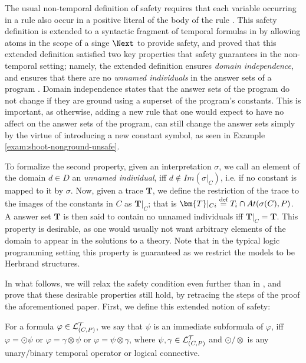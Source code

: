 The usual non-temporal definition of safety requires that each
variable occurring in a rule also occur in a positive literal of the
body of the rule \cite{gekakasc12a}. This safety definition is
extended to a syntactic fragment of temporal formulas in
\cite{agcapevidi17a} by allowing atoms in the scope of a singe $\Next$
to provide safety, and proved that this extended definition satisfied
two key properties that safety guarantees in the non-temporal setting;
namely, the extended definition ensures \emph{domain independence},
and ensures that there are no \emph{unnamed individuals} in the answer
sets of a program \cite{capeva09a}\cite{capeva09b}. Domain
independence states that the answer sets of the program do not change
if they are ground using a superset of the program's constants. This
is important, as otherwise, adding a new rule that one would expect to
have no affect on the answer sets of the program, can still change the
answer sets simply by the virtue of introducing a new constant symbol,
as seen in Example \ref{exam:shoot-nonground-unsafe}.

To formalize the second property, given an interpretation $\sigma$, we
call an element of the domain $d \in D$ an \emph{unnamed individual},
iff $d \not\in Im(\sigma\vert_{C})$, i.e. if no constant is mapped to
it by $\sigma$. Now, given a trace $\bm{T}$, we define the restriction
of the trace to the images of the constants in $C$ as
$\bm{T}\vert _C$; that is
$\bm{T}\vert_{Ci} \defeq T_i \cap At(\sigma(C),P)$. A answer set
$\bm{T}$ is then said to contain no unnamed individuals iff
$\bm{T} \vert_{C} = \bm{T}$. This property is desirable, as one would
usually not want arbitrary elements of the domain to appear in the
solutions to a theory. Note that in the typical logic programming
setting this property is guaranteed as we restrict the models to be
Herbrand structures.

In what follows, we will relax the safety condition even further than
in \cite{agcapevidi17a}, and prove that these desirable properties
still hold, by retracing the steps of the proof the aforementioned
paper. First, we define this extended notion of safety:

\begin{definition}
  For a formula $\varphi \in \mathcal{L}_{(C,P)}^\mathcal{T}$, we say
  that $\psi$ is an immediate subformula of $\varphi$, iff
  $\varphi = \odot \psi$ or $\varphi = \gamma \otimes \psi$ or
  $\varphi = \psi \otimes \gamma$, where
  $\psi, \gamma \in \mathcal{L}_{(C,P)}^\mathcal{T}$ and
  $\odot/\otimes$ is any unary/binary temporal operator or logical
  connective.
\end{definition}


